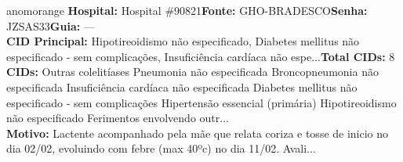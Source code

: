 \documentclass[a4paper,10pt]{article}
\begin{document}
\begin{anomalycard}[Interna\c{c}\~{a}o \#119446 | Pac. \#99056 | ALTO (z=4.12) | LOS: 13d | 26/02/2026\,$\to$\,11/03/2026]{anomorange}
\textbf{Hospital:} Hospital \#90821\quad \textbf{Fonte:} GHO-BRADESCO\quad \textbf{Senha:} JZSAS33\quad \textbf{Guia:} ---\\

\textbf{CID Principal:} {\small Hipotireoidismo não especificado, Diabetes mellitus não especificado - sem complicações, Insuficiência cardíaca não espe...}\quad\textbf{Total CIDs:} 8\\

\textbf{CIDs:} {\scriptsize Outras colelitíases \textbar{} Pneumonia não especificada \textbar{} Broncopneumonia não especificada \textbar{} Insuficiência cardíaca não especificada \textbar{} Diabetes mellitus não especificado - sem complicações \textbar{} Hipertensão essencial (primária) \textbar{} Hipotireoidismo não especificado \textbar{} Ferimentos envolvendo outr...}\\

\textbf{Motivo:} {\scriptsize Lactente acompanhado pela mãe que relata coriza e tosse de inicio no dia 02/02, evoluindo com febre (max 40ºc) no dia 11/02. Avali...}\\




\end{anomalycard}
\end{document}
